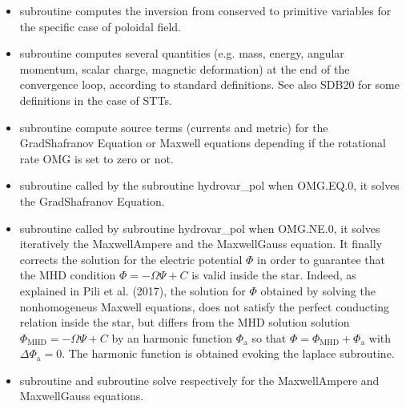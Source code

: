 \documentclass[letterpaper,10pt,english]{sphinxmanual}
\begin{document}
\begin{itemize}
\begin{itemize}
\item {} 
\sphinxAtStartPar
subroutine  \sphinxhyphen{} computes the inversion from conserved to primitive variables for the specific case of poloidal field.

\item {} 
\sphinxAtStartPar
subroutine  \sphinxhyphen{} computes several quantities (e.g. mass, energy, angular momentum, scalar charge, magnetic deformation) at the end of the convergence loop, according to standard definitions. See also SDB20 for some definitions in the case of STTs.

\item {} 
\sphinxAtStartPar
subroutine  \sphinxhyphen{} compute source terms (currents and metric) for the Grad\sphinxhyphen{}Shafranov
Equation or Maxwell equations depending if the rotational rate OMG is set to zero or not.

\item {} 
\sphinxAtStartPar
subroutine  \sphinxhyphen{} called by the subroutine hydrovar\_pol when OMG.EQ.0, it solves
the Grad\sphinxhyphen{}Shafranov Equation.

\item {} 
\sphinxAtStartPar
subroutine  \sphinxhyphen{} called by subroutine hydrovar\_pol when OMG.NE.0, it solves iteratively the Maxwell\sphinxhyphen{}Ampere and the Maxwell\sphinxhyphen{}Gauss equation. It finally corrects the solution for the electric potential \(\Phi\) in order to guarantee that the MHD condition \(\Phi = -\Omega \Psi + C\) is valid
inside the star. Indeed, as explained in Pili et al. (2017), the solution for \(\Phi\) obtained by solving
the non\sphinxhyphen{}homogeneus Maxwell equations, does not satisfy the perfect conducting relation inside
the star, but differs from the MHD solution solution \(\Phi _\mathrm{MHD} = -\Omega \Psi + C\) by an harmonic function
\(\Phi _\mathrm{a}\) so that \(\Phi = \Phi _\mathrm{MHD} + \Phi _\mathrm{a}\) with \(\Delta \Phi _\mathrm{a} = 0\). The harmonic function is obtained evoking the laplace subroutine.

\item {} 
\sphinxAtStartPar
subroutine  and subroutine  \sphinxhyphen{} solve respectively for the Maxwell\sphinxhyphen{}Ampere and Maxwell\sphinxhyphen{}Gauss equations.


\end{itemize}
\end{itemize}
\end{document}
